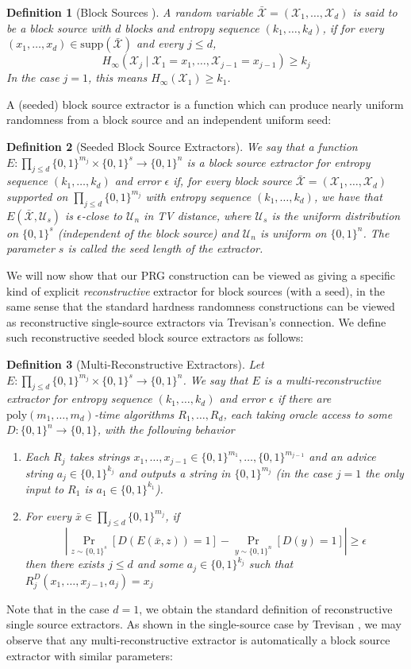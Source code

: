 \documentclass[11pt]{article}
\newtheorem{definition}{Definition}
\newcommand{\B}{\{0,1\}}
\renewcommand{\poly}{\mathrm{poly}}
\begin{document}
\begin{definition}[Block Sources \cite{CG}]
A random variable $\bar{\mathcal{X}}=(\mathcal{X}_1,\ldots,\mathcal{X}_d)$ is said to be a block source with $d$ blocks and entropy sequence $(k_1,\ldots,k_d)$, if for every $(x_1,\ldots,x_d) \in \mathrm{supp}(\bar{\mathcal{X}})$ and every $j \leq d$, 
\[
H_{\infty}(\mathcal{X}_{j} \mid \mathcal{X}_1 = x_1,\ldots, \mathcal{X}_{j-1}=x_{j-1}) \geq k_j
\]
In the case $j=1$, this means $H_{\infty}(\mathcal{X}_1) \geq k_1$.
\end{definition}
A (seeded) block source extractor is a function which can produce nearly uniform randomness from a block source and an independent uniform seed:
\begin{definition}[Seeded Block Source Extractors]
We say that a function $E: \prod_{j \leq d} \B^{m_j} \times \B^s \to \B^n$ is a block source extractor for entropy sequence $(k_1,\ldots,k_d)$ and error $\epsilon$ if, for every block source $\bar{\mathcal{X}} = (\mathcal{X}_1,\ldots,\mathcal{X}_d)$ supported on $\prod_{j \leq d} \B^{m_j}$ with entropy sequence $(k_1,\ldots,k_d)$, we have that $E(\bar{\mathcal{X}}, \mathcal{U}_s)$ is $\epsilon$-close to $\mathcal{U}_n$ in TV distance, where $\mathcal{U}_s$ is the uniform distribution on $\B^s$ (independent of the block source) and $\mathcal{U}_n$ is uniform on $\B^n$. The parameter $s$ is called the seed length of the extractor. 
\end{definition}
We will now show that our PRG construction can be viewed as giving a specific kind of explicit \emph{reconstructive} extractor for block sources (with a seed), in the same sense that the standard hardness randomness constructions can be viewed as reconstructive single-source extractors via Trevisan's connection. We define such reconstructive seeded block source extractors as follows:
\begin{definition}[Multi-Reconstructive Extractors]
Let $E: \prod_{j \leq d} \B^{m_j} \times \B^{s} \to \B^n$. We say that $E$ is a multi-reconstructive extractor for entropy sequence $(k_1,\ldots,k_d)$ and error $\epsilon$ if there are $\poly(m_1,\ldots,m_d)$-time algorithms $R_1,\ldots,R_d$, each taking oracle access to some $D: \B^n \to \B$, with the following behavior
\begin{enumerate}
	\item Each $R_j$ takes strings $x_1,\ldots,x_{j-1} \in \B^{m_1},\ldots,\B^{m_{j-1}}$ and an advice string $a_j \in  \B^{k_j}$ and outputs a string in $\B^{m_j}$ (in the case $j=1$ the only input to $R_1$ is $a_1\in \B^{k_1}$).
	\item For every $\bar{x} \in \prod_{j \leq d} \B^{m_j}$, if 
\[
|\Pr_{z \sim \B^s}[D( E(\bar{x}, z)) = 1] - \Pr_{y \sim \B^n} [D(y) = 1]| \geq \epsilon
\]
then there exists $j \leq d$ and some $a_j \in \B^{k_j}$ such that $R^D_j(x_1,\ldots,x_{j-1},a_j) = x_j$
\end{enumerate}
\end{definition}
Note that in the case $d=1$, we obtain the standard definition of reconstructive single source extractors. As shown in the single-source case by Trevisan \cite{trevisan}, we may observe that any multi-reconstructive extractor is automatically a block source extractor with similar parameters:
\end{document}
